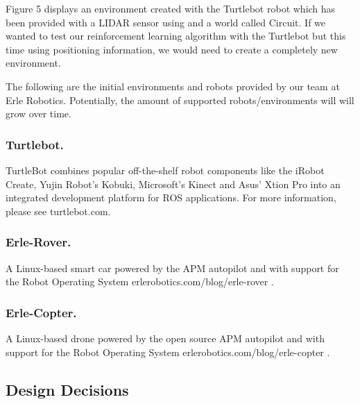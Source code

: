 Figure 5 displays an environment created with the Turtlebot robot which has been provided with a LIDAR sensor using and a world called Circuit. If we wanted to test our reinforcement learning algorithm with the Turtlebot but this time using positioning information, we would need to create a completely new environment.

The following are the initial environments and robots provided by our team at Erle Robotics. Potentially, the amount of supported robots/environments will will grow over time.

\subsubsection{Turtlebot.} TurtleBot combines popular off-the-shelf robot components like the iRobot Create, Yujin Robot's Kobuki, Microsoft's Kinect and Asus' Xtion Pro into an integrated development platform for ROS applications. For more information, please see turtlebot.com.

\subsubsection{Erle-Rover.} A Linux-based smart car powered by the APM autopilot and with support for the Robot Operating System erlerobotics.com/blog/erle-rover .

\subsubsection{Erle-Copter.} A Linux-based drone powered by the open source APM autopilot and with support for the Robot Operating System erlerobotics.com/blog/erle-copter .

\subsection{Design Decisions}

